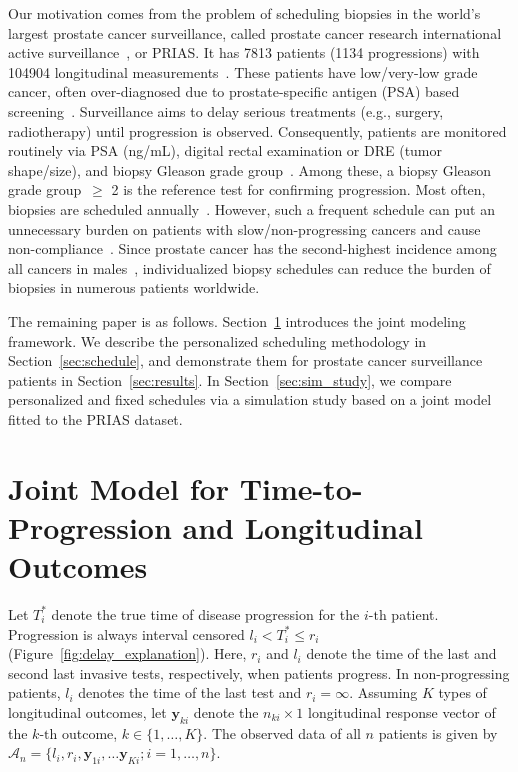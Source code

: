\documentclass[useAMS, usenatbib, referee]{biom}
\begin{document}
Our motivation comes from the problem of scheduling biopsies in the world's largest prostate cancer surveillance, called prostate cancer research international active surveillance~\citep{bokhorst2015compliance}, or PRIAS. It has 7813 patients (1134 progressions) with 104904 longitudinal measurements~\citep{tomer2020webapp}. These patients have low/very-low grade cancer, often over-diagnosed due to prostate-specific antigen (PSA) based screening~\citep{loeb2014overdiagnosis}. Surveillance aims to delay serious treatments (e.g., surgery, radiotherapy) until progression is observed. Consequently, patients are monitored routinely via PSA (ng/mL), digital rectal examination or DRE (tumor shape/size), and biopsy Gleason grade group~\citep{epsteinGG2014}. Among these, a biopsy Gleason grade group~$\geq$ 2 is the reference test for confirming progression. Most often, biopsies are scheduled annually~\citep{loeb2014heterogeneity}. However, such a frequent schedule can put an unnecessary burden on patients with slow/non-progressing cancers and cause non-compliance~\citep{bokhorst2015compliance}. Since prostate cancer has the second-highest incidence among all cancers in males~\citep{GlobalCancerStats2012}, individualized biopsy schedules can reduce the burden of biopsies in numerous patients worldwide.

The remaining paper is as follows. Section~\ref{sec:jointmodel} introduces the joint modeling framework. We describe the personalized scheduling methodology in Section~\ref{sec:schedule}, and demonstrate them for prostate cancer surveillance patients in Section~\ref{sec:results}. In Section~\ref{sec:sim_study}, we compare personalized and fixed schedules via a simulation study based on a joint model fitted to the PRIAS dataset.

\section{Joint Model for Time-to-Progression and Longitudinal Outcomes}
\label{sec:jointmodel}
Let $T_i^*$ denote the true time of disease progression for the ${i\mbox{-th}}$ patient. Progression is always interval censored ${l_i < T_i^* \leq r_i}$ (Figure~\ref{fig:delay_explanation}). Here, $r_i$ and $l_i$ denote the time of the last and second last invasive tests, respectively, when patients progress. In non-progressing patients, $l_i$ denotes the time of the last test and ${r_i=\infty}$. Assuming $K$ types of longitudinal outcomes, let $\boldsymbol{y}_{ki}$ denote the ${n_{ki} \times 1}$ longitudinal response vector of the ${k\mbox{-th}}$ outcome, $k \in \{1, \ldots, K\}$. The observed data of all $n$ patients is given by ${\mathcal{A}_n = \{l_i, r_i, \boldsymbol{y}_{1i},\ldots \boldsymbol{y}_{Ki}; i = 1, \ldots, n\}}$.
\end{document}
